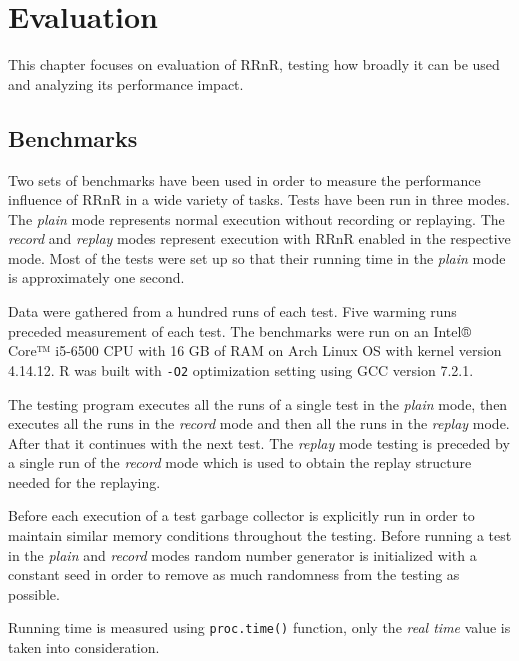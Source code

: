 \documentclass[thesis=M,english,hidelinks]{FITthesis}[2012/10/20]
\begin{document}
\chapter{Evaluation}
This chapter focuses on evaluation of RRnR, testing how broadly it can be used and analyzing its performance impact.\par

	\section{Benchmarks}
	Two sets of benchmarks have been used in order to measure the performance influence of RRnR in a wide variety of tasks. Tests have been run in three modes. The \emph{plain} mode represents normal execution without recording or replaying. The \emph{record} and \emph{replay} modes represent execution with RRnR enabled in the respective mode. Most of the tests were set up so that their running time in the \emph{plain} mode is approximately one second.\par
	
	Data were gathered from a hundred runs of each test. Five warming runs preceded measurement of each test. The benchmarks were run on an Intel® Core™ i5-6500 CPU with 16 GB of RAM on Arch Linux OS with kernel version 4.14.12. R was built with \lstinline|-O2| optimization setting using GCC version 7.2.1.\par
	
	The testing program executes all the runs of a single test in the \emph{plain} mode, then executes all the runs in the \emph{record} mode and then all the runs in the \emph{replay} mode. After that it continues with the next test. The \emph{replay} mode testing is preceded by a single run of the \emph{record} mode which is used to obtain the replay structure needed for the replaying.\par
	
	Before each execution of a test garbage collector is explicitly run in order to maintain similar memory conditions throughout the testing. Before running a test in the \emph{plain} and \emph{record} modes random number generator is initialized with a constant seed in order to remove as much randomness from the testing as possible.\par
	
	Running time is measured using \lstinline|proc.time()| function, only the \emph{real time} value is taken into consideration.\par
	
\end{document}
